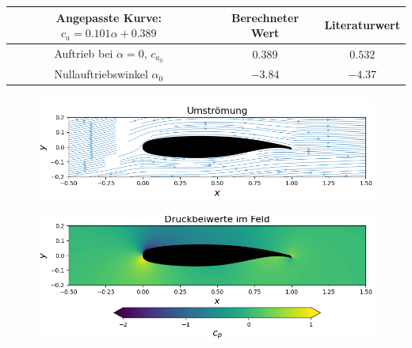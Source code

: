 \begin{table}[H]
\label{tab:sc20614cawerte}
\begin{center}
\begin{tabular}{c|cc}
Angepasste Kurve: $c_a = 0.101 \alpha + 0.389$ & Berechneter Wert & Literaturwert \cite{bigfoil} \\
\midrule
Auftrieb bei $\alpha = 0$, $c_{a_0}$ & $0.389$ & $0.532$ \\
Nullauftriebswinkel $\alpha_{0}$ & $-3.84$ & $-4.37$ 
\end{tabular}
\end{center}
\end{table}

\begin{figure}[H]
\begin{center} \includegraphics[scale=0.65]{figures/sc20614stream.png} \end{center}
\end{figure}
\begin{figure}[H]
\begin{center} \includegraphics[scale=0.65]{figures/sc20614contourcp.png} \end{center}
\end{figure}
\newpage
